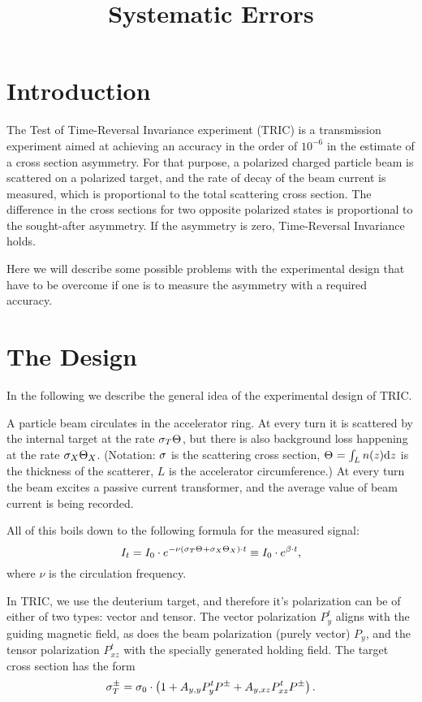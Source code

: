 \documentclass{article}
\begin{document}
\title{Systematic Errors}
\maketitle

\section*{Introduction}

The Test of Time-Reversal Invariance experiment (TRIC) is a transmission experiment aimed at achieving an accuracy in the order of $10^{-6}$ in the estimate of a cross section asymmetry. For that purpose, a polarized charged particle beam is scattered on a polarized target, and the rate of decay of the beam current is measured, which is proportional to the total scattering cross section. The difference in the cross sections for two opposite polarized states is proportional to the sought-after asymmetry. If the asymmetry is zero, Time-Reversal Invariance holds.

Here we will describe some possible problems with the experimental design that have to be overcome if one is to measure the asymmetry with a required accuracy.

\section{The Design}
In the following we describe the general idea of the experimental design of TRIC.

A particle beam circulates in the accelerator ring. At every turn it is scattered by the internal target at the rate $\CS[T]\Thick$, but there is also background loss happening at the rate $\CS[X]\Thick[X]$. (Notation: $\CS$ is the scattering cross section, $\Thick = \int_L n(z)\td z$ is the thickness of the scatterer, $L$ is the accelerator circumference.) At every turn the beam excites a passive current transformer, and the average value of beam current is being recorded. 

All of this boils down to the following formula for the measured signal:
\[
	I_t  = I_0 \cdot e^{-\nu\bkt{\CS[T]\Thick + \CS[X]\Thick[X]}\cdot t} \equiv I_0\cdot e^{\slp\cdot t},
\]
where $\nu$ is the circulation frequency.

In TRIC, we use the deuterium target, and therefore it's polarization can be of either of two types: vector and tensor. The vector polarization $P^t_y$ aligns with the guiding magnetic field, as does the beam polarization (purely vector) $P_y$, and the tensor polarization $P^t_{xz}$ with the specially generated holding field.  The target cross section has the form
\begin{equation}\label{eq:CrossSection}
	\CS[T]^\pm = \CS[0]\cdot\bkt{1 + \Ayy P^t_y P^\pm + \Ayxz P^t_{xz} P^\pm}.
\end{equation}
\end{document}
